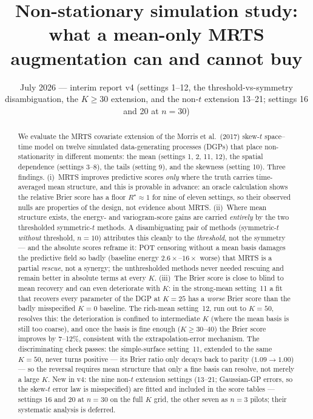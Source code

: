 \documentclass[11pt]{article}
\title{Non-stationary simulation study:\\
what a mean-only MRTS augmentation can and cannot buy}
\author{}
\date{July 2026 --- interim report v4 (settings 1--12, the
threshold-vs-symmetry disambiguation, the $K \ge 30$ extension, and the
non-$t$ extension 13--21; settings 16 and 20 at $n = 30$)}
\begin{document}
\maketitle

\begin{abstract}
We evaluate the MRTS covariate extension of the Morris et al.\ (2017) skew-$t$
space--time model on twelve simulated data-generating processes (DGPs) that place
non-stationarity in different moments: the mean (settings 1, 2, 11, 12), the spatial
dependence (settings 3--8), the tails (setting 9), and the skewness (setting 10).
Three findings.
(i)~MRTS improves predictive scores \emph{only} where the truth carries
time-averaged mean structure, and this is provable in advance: an oracle
calculation shows the relative Brier score has a floor $R^\star \approx 1$ for
nine of eleven settings, so their observed nulls are properties of the design,
not evidence about MRTS.
(ii)~Where mean structure exists, the energy- and variogram-score gains are
carried \emph{entirely} by the two thresholded symmetric-$t$ methods. A
disambiguating pair of methods (symmetric-$t$ \emph{without} threshold,
$n=10$) attributes this cleanly to the \emph{threshold}, not the symmetry ---
and the absolute scores reframe it: POT censoring without a mean basis damages
the predictive field so badly (baseline energy $2.6\times$--$16\times$ worse)
that MRTS is a partial \emph{rescue}, not a synergy; the unthresholded methods
never needed rescuing and remain better in absolute terms at every $K$.
(iii)~The Brier score is close to blind to mean recovery and can even
deteriorate with $K$: in the strong-mean setting~11 a fit that recovers every
parameter of the DGP at $K=25$ has a \emph{worse} Brier score than the badly
misspecified $K=0$ baseline. The rich-mean setting~12, run out to $K=50$,
resolves this: the deterioration is confined to intermediate $K$ (where the
mean basis is still too coarse), and once the basis is fine enough
($K \ge 30$--$40$) the Brier score improves by 7--12\%, consistent with the
extrapolation-error mechanism. The discriminating check passes: the
simple-surface setting~11, extended to the same $K = 50$, never turns
positive --- its Brier ratio only decays back to parity ($1.09 \to 1.00$) ---
so the reversal requires mean structure that only a fine basis can resolve,
not merely a large $K$.
New in v4: the nine non-$t$ extension settings (13--21; Gaussian-GP errors,
so the skew-$t$ error law is misspecified) are fitted and included in the
score tables --- settings 16 and 20 at $n = 30$ on the full $K$ grid, the
other seven as $n = 3$ pilots; their systematic analysis is deferred.
\end{abstract}
\end{document}
